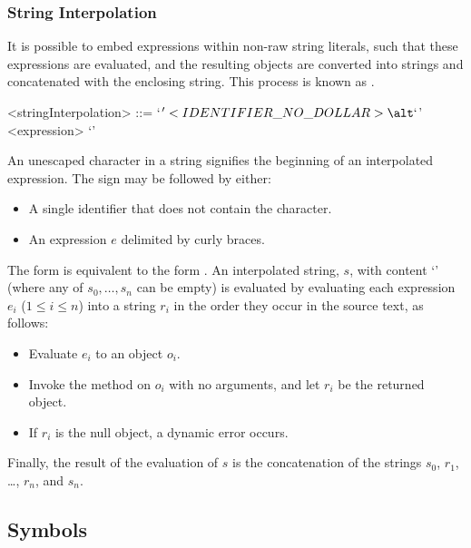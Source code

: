 \documentclass[makeidx]{article}
\begin{document}
{\subsubsection{String Interpolation}

\LMHash{}%
It is possible to embed expressions within non-raw string literals,
such that these expressions are evaluated,
and the resulting objects are converted into strings and
concatenated with the enclosing string.
This process is known as .

\begin{grammar}
<stringInterpolation> ::= `$' <IDENTIFIER\_NO\_DOLLAR>
  \alt `${' <expression> `}'
\end{grammar}


\LMHash{}%
An unescaped \lit{\$} character in a string signifies
the beginning of an interpolated expression.
The \lit{\$} sign may be followed by either:
\begin{itemize}
\item A single identifier \id{} that does not contain the \lit{\$} character.
\item An expression $e$ delimited by curly braces.
\end{itemize}

\LMHash{}%
The form \code{\$\id} is equivalent to the form \code{\$\{\id\}}.
An interpolated string, $s$, with content
`'
(where any of $s_0, \ldots, s_n$ can be empty)
is evaluated by evaluating each expression $e_i$ ($1 \le i \le n$)
into a string $r_i$ in the order they occur in the source text, as follows:
\begin{itemize}
\item Evaluate $e_i$ to an object $o_i$.
\item Invoke the  method on $o_i$ with no arguments,
  and let $r_i$ be the returned object.
\item If $r_i$ is the null object, a dynamic error occurs.
\end{itemize}
Finally, the result of the evaluation of $s$ is
the concatenation of the strings $s_0$, $r_1$, \ldots, $r_n$, and $s_n$.


\subsection{Symbols}

}
\end{document}
